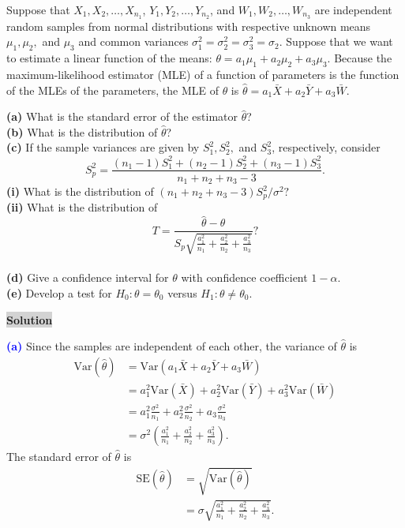 \documentclass[12pt]{article}
\newcommand{\mybox}{%
    \collectbox{%
        \setlength{\fboxsep}{2pt}%
        \fbox{\BOXCONTENT}%
    }%
}
\begin{document}
\noindent Suppose that $X_1, X_2, \ldots, X_{n_1}$, $Y_1, Y_2, \ldots, Y_{n_2}$, and $W_1, W_2, \ldots, W_{n_3}$ are independent random samples from normal distributions with respective unknown means $\mu_1, \mu_2,$ and $\mu_3$ and common variances $\sigma_1^2 = \sigma_2^2=\sigma_3^2=\sigma_2$.  Suppose that we want to estimate a linear function of the means: $\theta = a_1\mu_1 + a_2\mu_2 + a_3\mu_3$. Because the maximum-likelihood estimator (MLE) of a function of parameters is the function of the MLEs of the parameters, the MLE of $\theta$ is $\hat{\theta} = a_1\bar{X}+a_2\bar{Y}+a_3\bar{W}.$
\begin{flushleft}
\textbf{(a)} What is the standard error of the estimator $\hat{\theta}$? \\
\textbf{(b)} What is the distribution of $\hat{\theta}$? \\

\textbf{(c)} If the sample variances are given by $S_1^2, S_2^2,$ and $S_3^2$, respectively, consider $$S_p^2 = \frac{(n_1-1)S_1^2+(n_2-1)S_2^2+(n_3-1)S_3^2}{n_1+n_2+n_3 - 3}.$$
\hspace{5mm} \textbf{(i)} What is the distribution of $(n_1+n_2+n_3-3)S_p^2/\sigma^2?$ \\
\hspace{5mm} \textbf{(ii)} What is the distribution of $$T=\frac{\hat{\theta}-\theta}{S_p\sqrt{\frac{a_1^2}{n_1}+\frac{a_2^2}{n_2}+\frac{a_3^2}{n_3}}}?$$ \\
\textbf{(d)} Give a confidence interval for $\theta$ with confidence coefficient $1-\alpha$. \\
\textbf{(e)} Develop a test for $H_0: \theta = \theta_0$ versus $H_1: \theta\neq\theta_0$.
\end{flushleft}

\noindent\mybox{\colorbox{lightgray}{\textbf{Solution}}} \hspace{3mm}\hrulefill

\noindent \textcolor{blue}{\textbf{(a)}} Since the samples are independent of each other, the variance of $\hat{\theta}$ is
\begin{align}
\text{Var}\left(\hat{\theta}\right) &= \text{Var}\left(a_1\bar{X}+a_2\bar{Y}+a_3\bar{W}\right) \\
&= a_1^2\text{Var}\left(\bar{X}\right)+a_2^2\text{Var}\left(\bar{Y}\right)+a_3^2\text{Var}\left(\bar{W}\right) \\
&= a_1^2\frac{\sigma^2}{n_1} + a_2^2\frac{\sigma^2}{n_2} + a_3\frac{\sigma^2}{n_3} \\
&= \sigma^2\left(\frac{a_1^2}{n_1} + \frac{a_2^2}{n_2} + \frac{a_3^2}{n_3}\right).
\end{align}
The standard error of $\hat{\theta}$ is
\begin{align}
\text{SE}\left(\hat{\theta}\right) &= \sqrt{\text{Var}\left(\hat{\theta}\right)} \\
&= \sigma\sqrt{\frac{a_1^2}{n_1} + \frac{a_2^2}{n_2} + \frac{a_3^2}{n_3}}.
\end{align}
\end{document}
